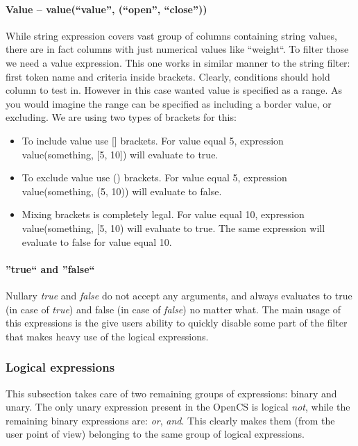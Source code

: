 \paragraph{Value -- value(``value'', (``open'', ``close''))}
While string expression covers vast group of columns containing string values, there are in fact columns with just numerical values like
``weight``. To filter those we need a value expression. This one works in similar manner to the string filter: first token name and criteria
inside brackets. Clearly, conditions should hold column to test in. However in this case wanted value is specified as a range.
As you would imagine the range can be specified as including a border value, or excluding. We are using two types of brackets for this:
\begin{itemize}
 \item To include value use [] brackets. For value equal 5, expression value(something, [5, 10]) will evaluate to true.
 \item To exclude value use () brackets. For value equal 5, expression value(something, (5, 10)) will evaluate to false.
 \item Mixing brackets is completely legal. For value equal 10, expression value(something, [5, 10) will evaluate to true. The same expression
 will evaluate to false for value equal 10.
\end{itemize}

\paragraph{''true`` and ''false``}
Nullary \textit{true} and \textit{false} do not accept any arguments, and always evaluates to true (in case of \textit{true})
and false (in case of \textit{false})  no matter what. The main usage of this expressions is the give users ability to quickly
disable some part of the filter that makes heavy use of the logical expressions. 

\subsubsection{Logical expressions}
This subsection takes care of two remaining groups of expressions: binary and unary. The only unary expression present in the OpenCS is logical
\textit{not}, while the remaining binary expressions are: \textit{or}, \textit{and}. This clearly makes them (from the user point of view)
belonging to the same group of logical expressions.


